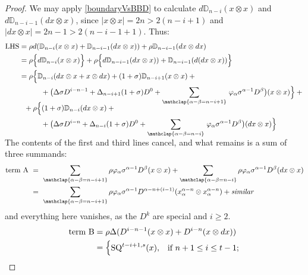 \documentclass[10pt]{article}
\newcommand{\twist}{\sigma}
\begin{document}
\begin{letter to Dwyer}
\begin{cor}
\end{cor}
\begin{proof}
We may apply \ref{boundaryVsBBD} to calculate $d\mathbb{D}_{n-i}(x\otimes x)$ and $d\mathbb{D}_{n-i-1}(dx\otimes x)$, since $|x\otimes x|=2n> 2(n-i+1)$ and $|dx\otimes x|=2n-1> 2(n-i-1+1)$. Thus:
\begin{alignat*}{2}
\textup{LHS}
&=
\rho d(\mathbb{D}_{n-i}(x\otimes x)+\mathbb{D}_{n-i-1}(dx\otimes x))+\rho\mathbb{D}_{n-i-1}(dx\otimes dx)%
\\
&=
\rho\Bigl\{d\mathbb{D}_{n-i}(x\otimes x)\Bigr\}+\rho\Bigl\{d\mathbb{D}_{n-i-1}(dx\otimes x))+\mathbb{D}_{n-i-1}(d(dx\otimes x))\Bigr\}%
\\
&=
\rho\Bigl\{\mathbb{D}_{n-i}(dx\otimes x+x\otimes dx)+(1+\twist)\mathbb{D}_{n-i+1}(x\otimes x)+{}
\\
&\ \ \ \ \ \ \ \ \ +\bigl(\Delta\sigma D^{i-n-1}+\Delta_{n-i+1}(1+\twist)D^0+\smash{\sum_{\mathclap{\alpha-\beta=n-i+1}}}\  \phi_{\alpha}\sigma^{\alpha-1}D^{\beta}\bigr)(x\otimes x)\Bigr\}+{}%
\\
&\ \ +\rho\Bigl\{(1+\twist)\mathbb{D}_{n-i}(dx\otimes x)+{}
\\
&\ \ \ \ \ \ \ \ \ +\bigl(\Delta\sigma D^{i-n}+\Delta_{n-i}(1+\twist)D^0+\smash{\sum_{\mathclap{\alpha-\beta=n-i}}}\ \phi_{\alpha}\sigma^{\alpha-1}D^{\beta}\bigr)(dx\otimes x)\Bigr\}
\end{alignat*}
The contents of the first and third lines cancel, and what remains is a sum of three summands:
\begin{alignat*}{2}
\textup{term A }
&=\ 
\sum_{\mathclap{\alpha-\beta=n-i+1}} \rho\phi_{\alpha}\sigma^{\alpha-1}D^{\beta}(x\otimes x)+\sum_{\mathclap{\alpha-\beta=n-i}} \rho\phi_{\alpha}\sigma^{\alpha-1}D^{\beta}(dx\otimes x)%
\\
&=\ 
\sum_{\mathclap{\alpha-\beta=n-i+1}} \rho\phi_{\alpha}\sigma^{\alpha-1}D^{\alpha-n+(i-1)}(x_\alpha^{\alpha-n}\otimes x_\alpha^{\alpha-n})+\textit{similar}%
\end{alignat*}
and everything here vanishes, as the $D^k$ are special and $i\geq2$.
\begin{alignat*}{2}
\textup{term B}
&=
\rho\Delta(D^{i-n-1}(x\otimes x)+D^{i-n}(x\otimes dx))%
\\
&=
\begin{cases}
\textup{SQ}^{t-i+1,s}(x),&\textup{if }n+1\leq i \leq t-1;\\

\end{cases}
\end{alignat*}
\end{proof}
\end{letter to Dwyer}
\end{document}
